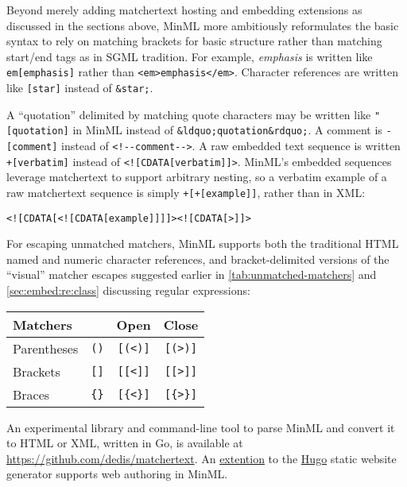 Beyond merely adding matchertext hosting and embedding extensions
as discussed in the sections above,
MinML more ambitiously reformulates the basic \ml syntax
to rely on matching brackets for basic structure
rather than matching start/end tags as in SGML tradition.
For example, \emph{emphasis} is written like
\verb|em[emphasis]| rather than \verb|<em>emphasis</em>|.
Character references are written like
\verb|[star]| instead of \verb|&star;|.

A ``quotation'' delimited by matching quote characters
may be written like
\verb|"[quotation]| in MinML instead of \verb|&ldquo;quotation&rdquo;|.
A comment is \verb|-[comment]| instead of \verb|<!--comment-->|.
A raw embedded text sequence
is written \verb|+[verbatim]| instead of \verb|<![CDATA[verbatim]]>|.
MinML's embedded sequences leverage matchertext
to support arbitrary nesting,
so a verbatim example of a raw matchertext sequence
is simply \verb|+[+[example]]|, rather than in XML:

\begin{footnotesize}
\begin{center}
\verb|<![CDATA[<![CDATA[example]]]]><![CDATA[>]]>|
\end{center}
\end{footnotesize}

For escaping unmatched matchers,
MinML supports both the traditional HTML named and numeric character references,
and bracket-delimited versions of the ``visual'' matcher escapes
suggested earlier in \cref{tab:unmatched-matchers}
and \cref{sec:embed:re:class} discussing regular expressions:

\begin{center}
\begin{tabular}{lccc}
Matchers	&		& Open		& Close		\\
\hline
Parentheses	& \verb|()|	& \verb|[(<)]|	& \verb|[(>)]|	\\
Brackets	& \verb|[]|	& \verb|[[<]]|	& \verb|[[>]]|	\\
Braces		& \verb|{}|	& \verb|[{<}]|	& \verb|[{>}]|	\\
\end{tabular}
\end{center}

An experimental library and command-line tool
to parse MinML and convert it to HTML or XML,
written in Go,
is available at \url{https://github.com/dedis/matchertext}.
An \href{https://github.com/bford/hugo}{extention}
to the \href{https://gohugo.io}{Hugo}
static website generator supports web authoring in MinML.

